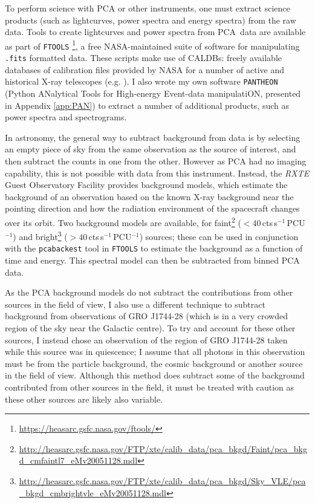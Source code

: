 \par To perform science with PCA or other instruments, one must extract science products (such as lightcurves, power spectra and energy spectra) from the raw data.  Tools to create lightcurves and power spectra from PCA\indexpca\ data are available as part of \texttt{FTOOLS} \footnote{\url{https://heasarc.gsfc.nasa.gov/ftools/}}, a free NASA-maintained suite of software for manipulating \texttt{.fits} formatted data.  These scripts make use of CALDBs: freely available databases of calibration files provided by NASA for a number of active and historical X-ray telescopes (e.g. \citealp{Graessle_ChaCALDB}).  I also wrote my own software \texttt{PANTHEON} (Python ANalytical Tools for High-energy Event-data manipulatiON, presented in Appendix \ref{app:PAN}) to extract a number of additional products, such as power spectra and spectrograms.
\par In astronomy, the general way to subtract background from data is by selecting an empty piece of sky from the same observation as the source of interest, and then subtract the counts in one from the other.  However as PCA had no imaging capability, this is not possible with data from this instrument.  Instead, the \textit{RXTE} Guest Observatory Facility provides background models, which estimate the background of an observation based on the known X-ray background near the pointing direction and how the radiation environment of the spacecraft changes over its orbit.  Two background models are available, for faint\footnote{\url{http://heasarc.gsfc.nasa.gov/FTP/xte/calib_data/pca_bkgd/Faint/pca_bkgd_cmfaintl7_eMv20051128.mdl}} ($<40$\,cts\,s$^{-1}$\,PCU$^{-1}$) and bright\footnote{\url{http://heasarc.gsfc.nasa.gov/FTP/xte/calib_data/pca_bkgd/Sky_VLE/pca_bkgd_cmbrightvle_eMv20051128.mdl}} ($>40$\,cts\,s$^{-1}$\,PCU$^{-1}$) sources; these can be used in conjunction with the \texttt{pcabackest} tool in \texttt{FTOOLS} to estimate the background as a function of time and energy.  This spectral model can then be subtracted from binned PCA data.
\par As the PCA background models do not subtract the contributions from other sources in the field of view, I also use a different technique to subtract background from observations of GRO J1744-28 (which is in a very crowded region of the sky near the Galactic centre).  To try and account for these other sources, I instead chose an observation of the region of GRO J1744-28 taken while this source was in quiescence; I assume that all photons in this observation must be from the particle background, the cosmic background or another source in the field of view.  Although this method does subtract some of the background contributed from other sources in the field, it must be treated with caution as these other sources are likely also variable.
